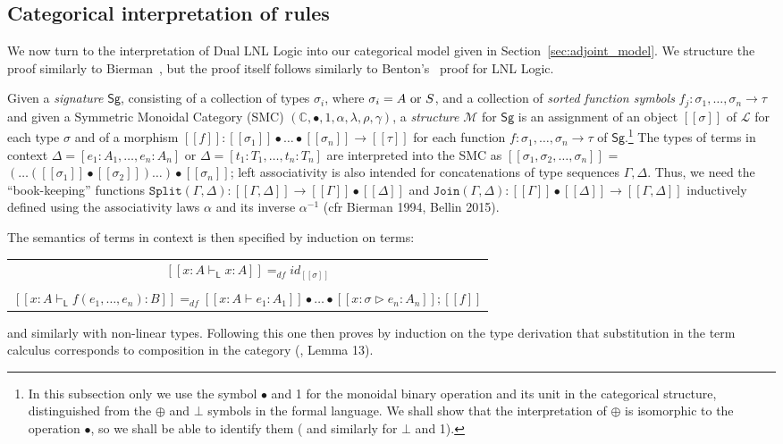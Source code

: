 \subsection{Categorical interpretation of rules}
\label{sec:categorical_interpretation_of_rules}

We now turn to the interpretation of Dual LNL Logic into our
categorical model given in Section~\ref{sec:adjoint_model}.  We
structure the proof similarly to Bierman~\cite{Bierman:1994}, but the
proof itself follows similarly to Benton's~\cite{Benton:1994} proof
for LNL Logic.

Given a {\em signature} $\mathsf{Sg}$, consisting of a collection of types $\sigma_i$, where $\sigma_i = A\ \hbox{or}\ S$, 
and a collection of {\em sorted function symbols} $f_j : \sigma_1, \ldots, \sigma_n \rightarrow \tau$ and given 
a Symmetric Monoidal Category (SMC) $(\mathbb{C}, \bullet, 1, \alpha, \lambda, \rho, \gamma)$,  a {\em structure} 
$\mathcal{M}$ for $\mathsf{Sg}$ is an assignment of an object $[\![\sigma]\!]$ of $\mathcal{L}$ for each type $\sigma$ and of 
a morphism $[\![f]\!] : [\![\sigma_1]\!]\bullet\ldots\bullet[\![\sigma_n]\!]\rightarrow [\![\tau]\!]$ for each function
$f : \sigma_1, \ldots, \sigma_n \rightarrow \tau$ of $\mathsf{Sg}$.\footnote{ In this subsection only we use the symbol $\bullet$
  and 1 for the monoidal binary operation and its unit in the categorical structure, distinguished from the $\oplus$ and
  $\bot$ symbols in the formal language. We shall show that the interpretation of $\oplus$ is isomorphic to the operation
  $\bullet$, so we shall be able to identify them ( and similarly for $\bot$ and 1).}  The types of terms in context $\Delta = [e_1: A_1, \ldots, e_n: A_n]$ or $\Delta = [t_1: T_1, \ldots, t_n: T_n]$ are 
interpreted into the SMC as $[\![\sigma_1, \sigma_2, \ldots, \sigma_n]\!]$ =   
$(\ldots ([\![\sigma_1]\!]\bullet[\![\sigma_2]\!])\ldots ) \bullet [\![\sigma_n]\!]$; left associativity is also 
intended for concatenations of type sequences $\Gamma, \Delta$. Thus, we need the ``book-keeping'' functions 
$\mathtt{Split}(\Gamma, \Delta): [\![\Gamma, \Delta]\!] \rightarrow [\![\Gamma]\!]\bullet [\![\Delta]\!]$ and 
$\mathtt{Join}(\Gamma, \Delta): [\![\Gamma]\!] \bullet  [\![\Delta]\!] \rightarrow [\![\Gamma, \Delta]\!]$ inductively defined 
using the associativity laws $\alpha$ and its inverse $\alpha^{-1}$ (cfr Bierman 1994, Bellin 2015).  

The semantics of terms in context is then specified by induction on terms: 
\begin{center}
  \begin{tabular}{c}
    $[\![x: A\vdash_{\mathsf{L}} x: A]\!] =_{df} id_{[\![\sigma]\!]}$\\
    \\
    $[\![x: A\vdash_{\mathsf{L}}  f(e_1,\ldots, e_n): B]\!] =_{df} [\![x: A\vdash e_1: A_1]\!]\bullet
    \ldots\bullet [\![x:\sigma\triangleright e_n: A_n]\!]; [\![ f ]\!]$
  \end{tabular}
\end{center}   
and similarly with non-linear types. 
Following this one then proves by induction on the type derivation that substitution in the term calculus 
corresponds to composition in the category (\cite{Bierman:1994}, Lemma 13). 

